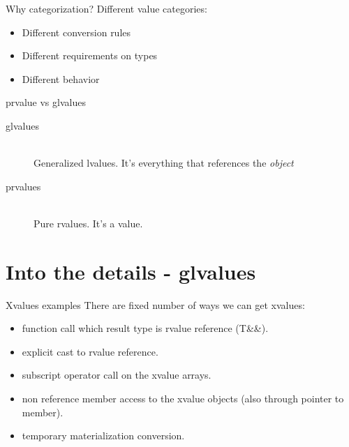 \documentclass[10pt]{beamer}
\begin{document}
\begin{frame}{Why categorization?}
Different value categories:
\begin{itemize}
	\item Different \alert{conversion rules}
	\item Different \alert{requirements on types}
	\item Different \alert{behavior}
\end{itemize}
\end{frame}


\begin{frame}{prvalue vs glvalues}
	\begin{description}
		\item[glvalues] \hfill \\ 
			Generalized lvalues. It's everything that \alert{references the \emph{object}}
		\item[prvalues] \hfill \\
			Pure rvalues. It's a \alert{value}.
	\end{description}
\end{frame}

\section{Into the details - glvalues}


\begin{frame}{Xvalues examples}
	There are fixed number of ways we can get xvalues:
	\begin{itemize}
		\item function call which result type is rvalue reference (T\&\&).
		\item explicit cast to rvalue reference.
		\item subscript operator call on the xvalue arrays.
		\item non reference member access to the xvalue objects (also through pointer to member).
		\item temporary materialization conversion.
	\end{itemize}
\end{frame}
\end{document}
